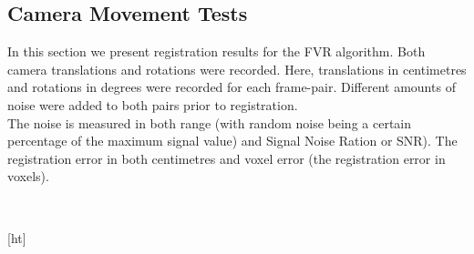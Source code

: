 

\subsection{Camera Movement Tests}

In this section we present registration results for the FVR algorithm. Both camera translations and rotations were recorded. Here, translations in centimetres and rotations in degrees were recorded for each frame-pair. Different amounts of noise were added to both pairs prior to registration. \\

The noise is measured in both range (with random noise being a certain percentage of the maximum signal value) and Signal Noise Ration or SNR). The registration error in both centimetres and voxel error (the registration error in voxels). 

\begin{table}[ht]
\centering
{}
\\
\caption{Translation Tracking}
\label{table:trans}
\end{table}[ht]

